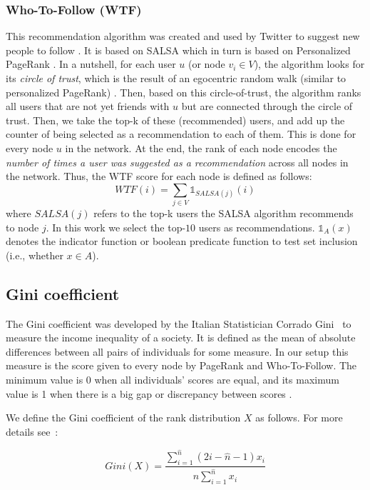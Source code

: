 \documentclass[fleqn,10pt]{wlscirep}
\begin{document}
\subsubsection*{Who-To-Follow (WTF)}
This recommendation algorithm was created and used by Twitter to suggest new people to follow \cite{gupta2013wtf}. It is based on SALSA \cite{lempel2001salsa} which in turn is based on Personalized PageRank \cite{jeh2003scaling}.
In a nutshell, for each user $u$ (or node $v_i \in V$), the algorithm looks for its \textit{circle of trust}, which is the result of an egocentric random walk (similar to personalized PageRank) \cite{gupta2013wtf}. Then, based on this circle-of-trust, the algorithm ranks all users that are not yet friends with $u$ but are connected through the circle of trust. Then, we take the top-k of these (recommended) users, and add up the counter of being selected as a recommendation to each of them. This is done for every node $u$ in the network. At the end, the rank of each node encodes the \textit{number of times a user was suggested as a recommendation} across all nodes in the network. Thus, the WTF score for each node is defined as follows:
\begin{equation}
    WTF(i) = \sum_{j\in V} \mathds{1}_{SALSA(j)}(i)
\end{equation}
where $SALSA(j)$ refers to the top-k users the SALSA algorithm recommends to node $j$. In this work we select the top-$10$ users as recommendations. $\mathds{1}_A(x)$ denotes the indicator function or boolean predicate function to test set inclusion (i.e., whether $x \in A$). 




\subsection*{Gini coefficient}
The Gini coefficient was developed by the Italian Statistician Corrado Gini~\cite{gini1912variabilita} to measure the income inequality of a society. 
It is defined as the mean of absolute differences between all pairs of individuals for some measure. In our setup this measure is the score given to every node by PageRank and Who-To-Follow. 
The minimum value is 0 when all individuals' scores are equal, and its maximum value is 1 when there is a big gap or discrepancy between scores \cite{ceriani2012origins}.

We define the Gini coefficient of the rank distribution $X$ as follows. For more details see~\cite{gini}: 

\begin{equation}
Gini(X)=\frac{\sum_{i=1}^{\hat{n}} (2i- \hat{n} -1)x_i}{n\sum_{i=1}^{\hat{n}} x_i}
\end{equation}
 
\end{document}
